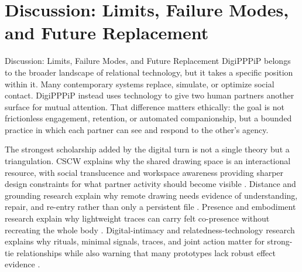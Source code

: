 \documentclass[
  ignorenonframetext,
]{beamer}
\author{\texorpdfstring{}{}}
\date{}
\begin{document}
\section{Discussion: Limits, Failure Modes, and Future
Replacement}\label{sec:discussion}

\begin{frame}[allowframebreaks]{Discussion: Limits, Failure Modes, and
Future Replacement}
DigiPPPiP belongs to the broader landscape of relational technology, but
it takes a specific position within it. Many contemporary systems
replace, simulate, or optimize social contact. DigiPPPiP instead uses
technology to give two human partners another surface for mutual
attention. That difference matters ethically: the goal is not
frictionless engagement, retention, or automated companionship, but a
bounded practice in which each partner can see and respond to the
other's agency.

The strongest scholarship added by the digital turn is not a single
theory but a triangulation. CSCW explains why the shared drawing space
is an interactional resource, with social translucence and workspace
awareness providing sharper design constraints for what partner activity
should become visible .
Distance and grounding research explain why remote drawing needs
evidence of understanding, repair, and re-entry rather than only a
persistent file . Presence
and embodiment research explain why lightweight traces can carry felt
co-presence without recreating the whole body . Digital-intimacy and
relatedness-technology research explains why rituals, minimal signals,
traces, and joint action matter for strong-tie relationships while also
warning that many prototypes lack robust effect evidence
.


\end{frame}
\end{document}
